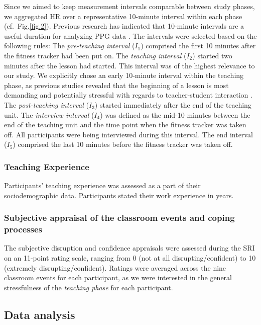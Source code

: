 \documentclass[preprint,
3p]{elsarticle} %
\begin{document}
Since we aimed to keep measurement intervals comparable between study
phases, we aggregated HR over a representative 10-minute interval within
each phase (cf.~Fig.\ref{fig.2}). Previous research has indicated that
10-minute intervals are a useful duration for analyzing PPG data
\citep{lu2008can}. The intervals were selected based on the following
rules: The \emph{pre-teaching interval} (\(I_1\)) comprised the first 10
minutes after the fitness tracker had been put on. The \emph{teaching
interval} (\(I_2\)) started two minutes after the lesson had started.
This interval was of the highest relevance to our study. We explicitly
chose an early 10-minute interval within the teaching phase, as previous
studies revealed that the beginning of a lesson is most demanding and
potentially stressful with regards to teacher-student interaction
\citep{donker2018, claessens2017positive}. The \emph{post-teaching
interval} (\(I_3\)) started immediately after the end of the teaching
unit. The \emph{interview interval} (\(I_4\)) was defined as the mid-10
minutes between the end of the teaching unit and the time point when the
fitness tracker was taken off. All participants were being interviewed
during this interval. The end interval (\(I_5\)) comprised the last 10
minutes before the fitness tracker was taken off.

\subsubsection{Teaching Experience}\label{teaching-experience}

Participants' teaching experience was assessed as a part of their
sociodemographic data. Participants stated their work experience in
years.

\subsubsection{Subjective appraisal of the classroom events and coping
processes}\label{subjective-appraisal-of-the-classroom-events-and-coping-processes}

The subjective disruption and confidence appraisals were assessed during
the SRI on an 11-point rating scale, ranging from 0 (not at all
disrupting/confident) to 10 (extremely disrupting/confident). Ratings
were averaged across the nine classroom events for each participant, as
we were interested in the general stressfulness of the \emph{teaching
phase} for each participant.

\subsection{Data analysis}\label{data-analysis}
\end{document}
